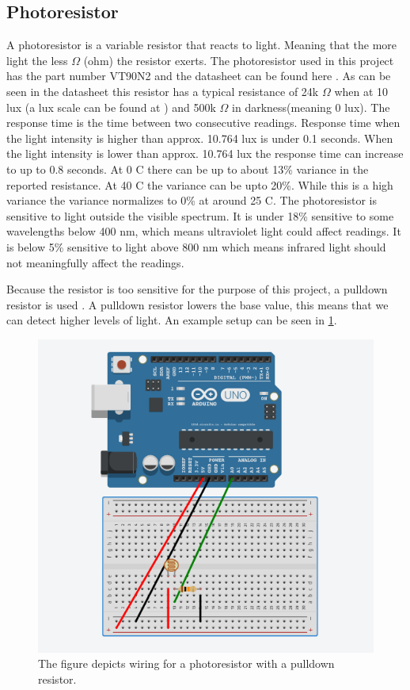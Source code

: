 \subsection{Photoresistor}
A photoresistor is a variable resistor that reacts to light. Meaning that the more light the less $\Omega$ (ohm) the resistor exerts. The photoresistor used in this project has the part number VT90N2 and the datasheet can be found here \cite{photoresistor_sheet}. As can be seen in the datasheet this resistor has a typical resistance of 24k $\Omega$ when at 10 lux (a lux scale can be found at \cite{lux_scale}) and 500k $\Omega$ in darkness(meaning 0 lux). The response time is the time between two consecutive readings. Response time when the light intensity is higher than approx. 10.764 lux is under 0.1 seconds. When the light intensity is lower than approx. 10.764 lux the response time can increase to up to 0.8 seconds. At 0 \degree C there can be up to about 13\% variance in the reported resistance. At 40 \degree C the variance can be upto 20\%. While this is a high variance the variance normalizes to 0\% at around 25 \degree C. The photoresistor is sensitive to light outside the visible spectrum. It is under 18\% sensitive to some wavelengths below 400 nm, which means ultraviolet light could affect readings. It is below 5\% sensitive to light above 800 nm which means infrared light should not meaningfully affect the readings.

Because the resistor is too sensitive for the purpose of this project, a pulldown resistor is used \cite{pulldown_resistor}. A pulldown resistor lowers the base value, this means that we can detect higher levels of light. An example setup can be seen in \cref{fig:arduino_photoresistor_wiring}.

\begin{figure}[htbp]
  \centering
  \includegraphics[width=\textwidth]{Design/PhotoSensorTests/Images/photoresistor_setup.png}
  \caption{The figure depicts wiring for a photoresistor with a pulldown resistor.}\label{fig:arduino_photoresistor_wiring}
\end{figure}

